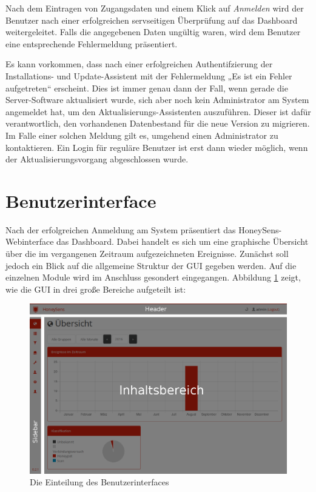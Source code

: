 \documentclass[12pt]{article}
\begin{document}
Nach dem Eintragen von Zugangsdaten und einem Klick auf \textit{Anmelden} wird der Benutzer nach einer erfolgreichen servseitigen Überprüfung auf das Dashboard weitergeleitet. Falls die angegebenen Daten ungültig waren, wird dem Benutzer eine entsprechende Fehlermeldung präsentiert.

Es kann vorkommen, dass nach einer erfolgreichen Authentifzierung der Installations- und Update-Assistent mit der Fehlermeldung „Es ist ein Fehler aufgetreten“ erscheint. Dies ist immer genau dann der Fall, wenn gerade die Server-Software aktualisiert wurde, sich aber noch kein Administrator am System angemeldet hat, um den Aktualisierungs-Assistenten auszuführen. Dieser ist dafür verantwortlich, den vorhandenen Datenbestand für die neue Version zu migrieren. Im Falle einer solchen Meldung gilt es, umgehend einen Administrator zu kontaktieren. Ein Login für reguläre Benutzer ist erst dann wieder möglich, wenn der Aktualisierungsvorgang abgeschlossen wurde.

\section{Benutzerinterface}
Nach der erfolgreichen Anmeldung am System präsentiert das HoneySens-Webinterface das Dashboard. Dabei handelt es sich um eine graphische Übersicht über die im vergangenen Zeitraum aufgezeichneten Ereignisse. Zunächst soll jedoch ein Blick auf die allgemeine Struktur der GUI gegeben werden. Auf die einzelnen Module wird im Anschluss gesondert eingegangen. Abbildung \ref{fig:user-interface} zeigt, wie die GUI in drei große Bereiche aufgeteilt ist:

\begin{figure}[h]
				\centering
				\includegraphics[width=\textwidth]{./graphics/interface.png}
				\caption{Die Einteilung des Benutzerinterfaces}
				\label{fig:user-interface}
\end{figure}
\end{document}
